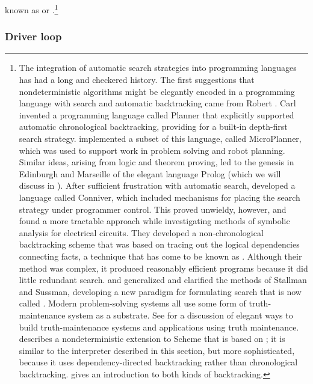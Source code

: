 known as  or .\footnote{The integration of
automatic search strategies into programming languages has had a long and
checkered history.  The first suggestions that nondeterministic algorithms
might be elegantly encoded in a programming language with search and automatic
backtracking came from Robert .  Carl  invented a
programming language called Planner that explicitly supported automatic
chronological backtracking, providing for a built-in depth-first search
strategy.   implemented a subset of this
language, called MicroPlanner, which was used to support work in problem
solving and robot planning.  Similar ideas, arising from logic and theorem
proving, led to the genesis in Edinburgh and Marseille of the elegant language
Prolog (which we will discuss in ).  After sufficient
frustration with automatic search,  developed a
language called Conniver, which included mechanisms for placing the search
strategy under programmer control.  This proved unwieldy, however, and 
found a more tractable approach while investigating methods
of symbolic analysis for electrical circuits.  They developed a
non-chronological backtracking scheme that was based on tracing out the logical
dependencies connecting facts, a technique that has come to be known as
.  Although their method was complex,
it produced reasonably efficient programs because it did little redundant
search.   and  generalized and clarified the
methods of Stallman and Sussman, developing a new paradigm for formulating
search that is now called .  Modern problem-solving
systems all use some form of truth-maintenance system as a substrate.  See
 for a discussion of elegant ways to build
truth-maintenance systems and applications using truth maintenance.
 describes a nondeterministic extension to Scheme
that is based on ; it is similar to the interpreter described in this
section, but more sophisticated, because it uses dependency-directed
backtracking rather than chronological backtracking.   gives an
introduction to both kinds of backtracking.}

\subsubsection*{Driver loop}

